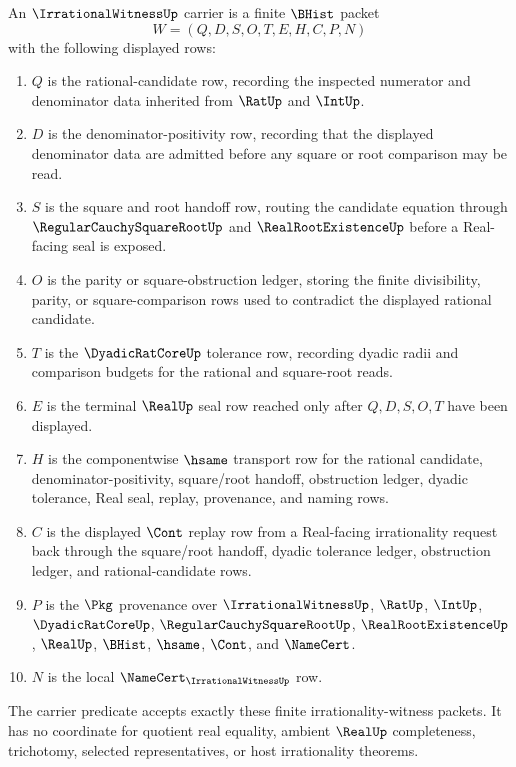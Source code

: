 \begin{definition}
\label{def:irrational-witness-carrier}
An $\IrrationalWitnessUp$ carrier is a finite $\BHist$ packet
$$
W=(Q,D,S,O,T,E,H,C,P,N)
$$
with the following displayed rows:
\begin{enumerate}
\item $Q$ is the rational-candidate row, recording the inspected numerator and denominator data inherited from $\RatUp$ and $\IntUp$.
\item $D$ is the denominator-positivity row, recording that the displayed denominator data are admitted before any square or root comparison may be read.
\item $S$ is the square and root handoff row, routing the candidate equation through $\RegularCauchySquareRootUp$ and $\RealRootExistenceUp$ before a Real-facing seal is exposed.
\item $O$ is the parity or square-obstruction ledger, storing the finite divisibility, parity, or square-comparison rows used to contradict the displayed rational candidate.
\item $T$ is the $\DyadicRatCoreUp$ tolerance row, recording dyadic radii and comparison budgets for the rational and square-root reads.
\item $E$ is the terminal $\RealUp$ seal row reached only after $Q,D,S,O,T$ have been displayed.
\item $H$ is the componentwise $\hsame$ transport row for the rational candidate, denominator-positivity, square/root handoff, obstruction ledger, dyadic tolerance, Real seal, replay, provenance, and naming rows.
\item $C$ is the displayed $\Cont$ replay row from a Real-facing irrationality request back through the square/root handoff, dyadic tolerance ledger, obstruction ledger, and rational-candidate rows.
\item $P$ is the $\Pkg$ provenance over $\IrrationalWitnessUp$, $\RatUp$, $\IntUp$, $\DyadicRatCoreUp$, $\RegularCauchySquareRootUp$, $\RealRootExistenceUp$, $\RealUp$, $\BHist$, $\hsame$, $\Cont$, and $\NameCert$.
\item $N$ is the local $\NameCert_{\IrrationalWitnessUp}$ row.
\end{enumerate}
The carrier predicate accepts exactly these finite irrationality-witness packets. It has no coordinate for quotient real equality, ambient $\RealUp$ completeness, trichotomy, selected representatives, or host irrationality theorems.
\end{definition}

